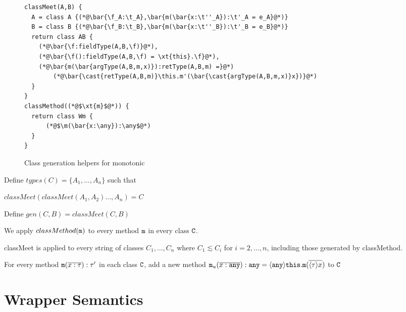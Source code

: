 \documentclass{sigplanconf}
\begin{document}
\begin{figure}
\begin{lstlisting}
classMeet(A,B) {
  A = class A {(*@\bar{\f_A:\t_A},\bar{m(\bar{x:\t''_A}):\t'_A = e_A}@*)}
  B = class B {(*@\bar{\f_B:\t_B},\bar{m(\bar{x:\t''_B}):\t'_B = e_B}@*)}
  return class AB {
    (*@\bar{\f:fieldType(A,B,\f)}@*),
    (*@\bar{\f():fieldType(A,B,\f) = \xt{this}.\f}@*),
    (*@\bar{m(\bar{argType(A,B,m,x)}):retType(A,B,m) =}@*)
    	(*@\bar{\cast{retType(A,B,m)}\this.m'(\bar{\cast{argType(A,B,m,x)}x})}@*)
  }
}
classMethod((*@$\xt{m}$@*)) {
  return class Wm {
      (*@$\m(\bar{x:\any}):\any$@*)
  }
}
\end{lstlisting}
\caption{Class generation helpers for monotonic}
\end{figure}

Define $types(C) = \{A_1,\ldots,A_n\}$ such that 

$classMeet(classMeet(A_1,A_2)\ldots,A_n) = C$

Define $gen(C, B) = classMeet(C,B)$

We apply $classMethod(\texttt{m})$ to every method $\texttt{m}$ in every class $\texttt{C}$.

classMeet is applied to every string of classes $C_1,\ldots,C_n$ where $C_1 \lesssim C_i$ for $i=2,\ldots,n$, including those generated by classMethod.

For every method $\texttt{m}(\overline{ x:\tau} ):\tau'$ in each class $\texttt{C}$, add a new method $\texttt{m}_u(\overline{ x:\texttt{any}} ):\texttt{any} = \langle \texttt{any}\rangle\texttt{this}.\texttt{m}(\overline{ \langle \tau\rangle x} )$ to $\texttt{C}$

\section{Wrapper Semantics}
\end{document}
